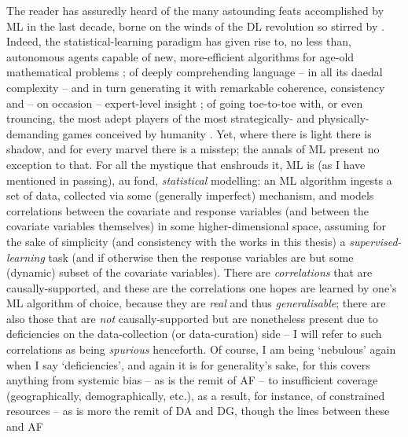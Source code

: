 The reader has assuredly heard of the many astounding feats accomplished by \ac{ML} in the last
decade, borne on the winds of the \acf{DL} revolution so stirred by \cite{krizhevsky2012imagenet}.
%
Indeed, the statistical-learning paradigm has given rise to, no less than, autonomous agents
capable of new, more-efficient algorithms for age-old mathematical problems
\citep{fawzi2022discovering}; of deeply comprehending language -- in all its daedal complexity --
and in turn generating it with remarkable coherence, consistency and -- on occasion -- expert-level
insight \citep{brown2020language}; of going toe-to-toe with, or even trouncing, the most adept
players of the most strategically- and physically-demanding games conceived by humanity
\citep{silver2017mastering,berner2019dota,vinyals2019grandmaster,meta2022human}.
%
Yet, where there is light there is shadow, and for every marvel there is a misstep; the annals of
\ac{ML} present no exception to that.
%
For all the mystique that enshrouds it, \ac{ML} is (as I have mentioned in passing), au fond,
\emph{statistical} modelling: an \ac{ML} algorithm ingests a set of data, collected via some (generally
imperfect) mechanism, and models correlations between the covariate and response variables (and
between the covariate variables themselves) in some higher-dimensional space, assuming for the sake
of simplicity (and consistency with the works in this thesis) a \emph{supervised-learning} task
(and if otherwise then the response variables are but some (dynamic) subset of the covariate
variables).
%
%
%
There are \emph{correlations} that are causally-supported, and these are the correlations one hopes
are learned by one's \ac{ML} algorithm of choice, because they are \emph{real} and thus
\emph{generalisable}; there are also those that are \emph{not} causally-supported but are
nonetheless present due to deficiencies on the data-collection (or data-curation) side -- I will
refer to such correlations as being \emph{spurious} henceforth.
%
Of course, I am being `nebulous' again when I say `deficiencies', and again it is for generality's
sake, for this covers anything from systemic bias -- as is the remit of \acf{AF} -- to insufficient
coverage (geographically, demographically, etc.), as a result, for instance, of constrained
resources -- as is more the remit of \acf{DA} and \acf{DG}, though the lines between these and AF
